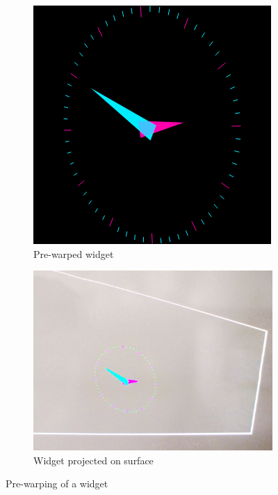 \begin{figure}[htbp]
\begin{subfigure}[b]{0.27\textwidth}
                \includegraphics[width=\textwidth]{images/software/clock_warped.png}
                \caption{Pre-warped widget}
                \label{img:SimpleWarpClock2}
        \end{subfigure}
         \hfill
        \begin{subfigure}[b]{0.36\textwidth}
                \includegraphics[width=\textwidth]{images/software/clock_project.jpg}
                \caption{Widget projected on surface}
                \label{img:SimpleWarpClock3}
        \end{subfigure}
        \caption{Pre-warping of a widget}\label{img:SimpleWarpClock}
\end{figure}


